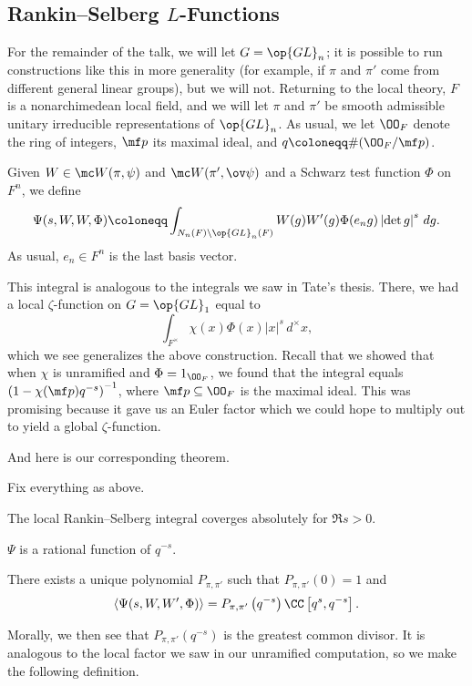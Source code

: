 \documentclass{article}
\begin{document}
\subsection{Rankin--Selberg \texorpdfstring{$L$}{L}-Functions}
For the remainder of the talk, we will let $G=\op{GL}_n$; it is possible to run constructions like this in more generality (for example, if $\pi$ and $\pi'$ come from different general linear groups), but we will not. Returning to the local theory, $F$ is a nonarchimedean local field, and we will let $\pi$ and $\pi'$ be smooth admissible unitary irreducible representations of $\op{GL}_n$. As usual, we let $\OO_F$ denote the ring of integers, $\mf p$ its maximal ideal, and $q\coloneqq\#(\OO_F/\mf p)$.
\begin{definition}
	Given $W\in\mc W(\pi,\psi)$ and $\mc W(\pi',\ov\psi)$ and a Schwarz test function $\Phi$ on $F^n$, we define
	\[\Psi(s,W,W,\Phi)\coloneqq\int_{N_n(F)\backslash\op{GL}_n(F)}W(g)W'(g)\Phi(e_ng)\left|\det g\right|^s\,dg.\]
	As usual, $e_n\in F^n$ is the last basis vector.
\end{definition}
\begin{remark}
	This integral is analogous to the integrals we saw in Tate's thesis. There, we had a local $\zeta$-function on $G=\op{GL}_1$ equal to
	\[\int_{F^\times}\chi(x)\Phi(x)\left|x\right|^s\,d^\times x,\]
	which we see generalizes the above construction. Recall that we showed that when $\chi$ is unramified and $\Phi=1_{\OO_F}$, we found that the integral equals $\left(1-\chi(\mf p)q^{-s}\right)^{-1}$, where $\mf p\subseteq\OO_F$ is the maximal ideal. This was promising because it gave us an Euler factor which we could hope to multiply out to yield a global $\zeta$-function.
\end{remark}
And here is our corresponding theorem.
\begin{theorem}
	Fix everything as above.
	\begin{listalph}
		\item The local Rankin--Selberg integral coverges absolutely for $\Re s>0$.
		\item $\Psi$ is a rational function of $q^{-s}$.
		\item There exists a unique polynomial $P_{\pi,\pi'}$ such that $P_{\pi,\pi'}(0)=1$ and
		\[\langle\Psi(s,W,W',\Phi)\rangle=P_{\pi,\pi'}\left(q^{-s}\right)\CC\left[q^s,q^{-s}\right].\]
	\end{listalph}
\end{theorem}
Morally, we then see that $P_{\pi,\pi'}\left(q^{-s}\right)$ is the greatest common divisor. It is analogous to the local factor we saw in our unramified computation, so we make the following definition.
\end{document}

